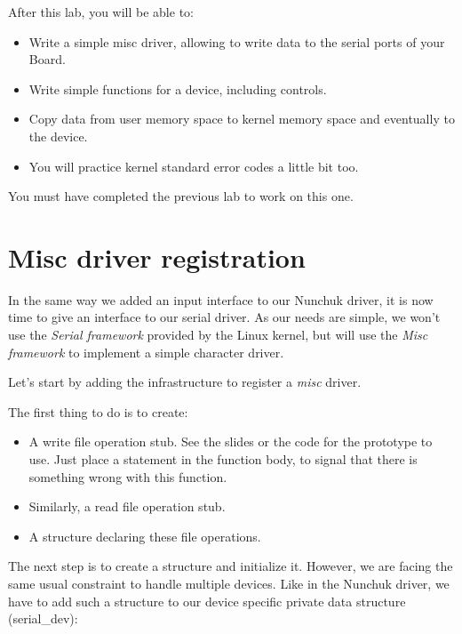 
After this lab, you will be able to:

\begin{itemize}
\item Write a simple misc driver, allowing to write data to the
  serial ports of your Board.
\item Write simple  functions for a device,
  including  controls.
\item Copy data from user memory space to kernel memory space and
  eventually to the device.
\item You will practice kernel standard error codes a little bit too.
\end{itemize}

You must have completed the previous lab to work on this one.

\section{Misc driver registration}

In the same way we added an input interface to our Nunchuk driver, it is
now time to give an interface to our serial driver. As our needs are
simple, we won't use the {\em Serial framework} provided by the Linux
kernel, but will use the {\em Misc framework} to implement a simple
character driver.

Let's start by adding the infrastructure to register a {\em misc}
driver.

The first thing to do is to create:

\begin{itemize}
\item A  write file operation stub.
      See the slides or the code for the prototype to use.
      Just place a  statement in the function
      body, to signal that there is something wrong with this function.
\item Similarly, a  read file operation stub.
\item A  structure declaring these file
      operations.
\end{itemize}

The next step is to create a  structure and initialize
it. However, we are facing the same usual constraint to handle multiple
devices. Like in the Nunchuk driver, we have to add such a structure
to our device specific private data structure (serial\_dev):

